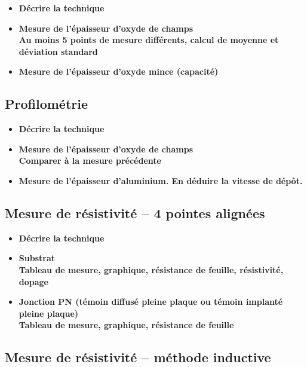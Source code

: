 \documentclass[11pt]{article}
\begin{document}
\begin{itemize}
\item \textbf{ D\'ecrire la technique  }
\item \textbf{ Mesure de l'\'epaisseur d'oxyde de champs \\ 
Au moins 5 points de mesure diff\'erents, calcul de moyenne et d\'eviation standard}
\item \textbf{ Mesure de l'\'epaisseur d'oxyde mince (capacit\'e)}
\end{itemize}


\subsection{Profilom\'etrie}

\begin{itemize}
\item \textbf{ D\'ecrire la technique  }
\item \textbf{ Mesure de l'\'epaisseur d'oxyde de champs \\ 
 Comparer \`a la mesure pr\'ec\'edente}
\item \textbf{ Mesure de l'\'epaisseur d'aluminium. En d\'eduire la vitesse de d\'ep\^ot.}
\end{itemize}

\subsection{Mesure de r\'esistivit\'e -- 4 pointes align\'ees}

\begin{itemize}
\item \textbf{ D\'ecrire la technique  }
\item \textbf{ Substrat \\ 
  Tableau de mesure, graphique, r\'esistance de feuille, r\'esistivit\'e, dopage}
\item \textbf{ Jonction PN (t\'emoin diffus\'e pleine plaque ou t\'emoin implant\'e pleine plaque) \\ 
Tableau de mesure, graphique, r\'esistance de feuille}
\end{itemize}

    

\subsection{Mesure de r\'esistivit\'e – m\'ethode inductive}
\end{document}
